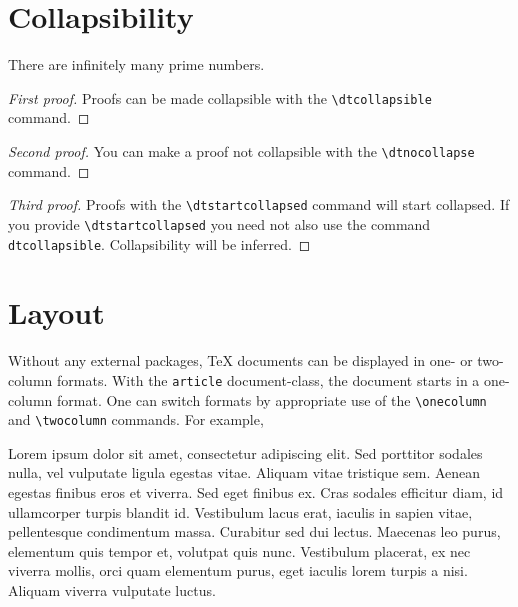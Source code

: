 \documentclass[11pt]{article}
\begin{document}
\begin{center}
\end{center}

\section{Collapsibility}

\begin{theorem}
    There are infinitely many prime numbers.
\end{theorem}

\begin{proof}[First proof]\dtcollapsible
    Proofs can be made collapsible with the \verb|\dtcollapsible| command.
\end{proof}

\begin{proof}[Second proof]\dtnocollapse
    You can make a proof not collapsible with the \verb|\dtnocollapse| command.
\end{proof}

\begin{proof}[Third proof]\dtstartcollapsed
    Proofs with the \verb|\dtstartcollapsed| command will start collapsed.
    If you provide \verb|\dtstartcollapsed| you need not also use the command \verb|dtcollapsible|.
    Collapsibility will be inferred.
\end{proof}

\section{Layout}
Without any external packages, \TeX{} documents can be displayed in one- or two-column formats.
With the \verb|article| document-class, the document starts in a one-column format.
One can switch formats by appropriate use of the \verb|\onecolumn| and \verb|\twocolumn| commands.
For example,

\twocolumn
Lorem ipsum dolor sit amet, consectetur adipiscing elit. Sed porttitor sodales nulla, vel vulputate ligula egestas vitae. Aliquam vitae tristique sem. Aenean egestas finibus eros et viverra. Sed eget finibus ex. Cras sodales efficitur diam, id ullamcorper turpis blandit id. Vestibulum lacus erat, iaculis in sapien vitae, pellentesque condimentum massa. Curabitur sed dui lectus. Maecenas leo purus, elementum quis tempor et, volutpat quis nunc. Vestibulum placerat, ex nec viverra mollis, orci quam elementum purus, eget iaculis lorem turpis a nisi. Aliquam viverra vulputate luctus.
\end{document}
